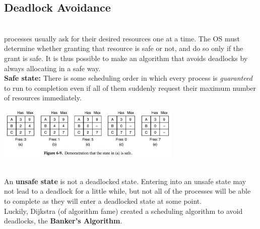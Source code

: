 \documentclass{article}
\begin{document}
\subsection*{Deadlock Avoidance}
\\processes usually ask for their desired resources one at a time. The OS must determine whether granting that resource is safe or not, and do so only if the grant is safe. It is thus possible to make an algorithm that avoids deadlocks by always allocating in a safe way.
\\\textbf{Safe state:} There is some scheduling order in which every process is \textit{guaranteed} to run to completion even if all of them suddenly request their maximum number of resources immediately.
\begin{center}
\includegraphics[width= 250pt]{tex/ch6/6-9.png}
\end{center}
\\An \textbf{unsafe state} is not a deadlocked state. Entering into an unsafe state may not lead to a deadlock for a little while, but not all of the processes will be able to complete as they will enter a deadlocked state at some point.
\\Luckily, Dijkstra (of algorithm fame) created a scheduling algorithm to avoid deadlocks, the \textbf{Banker's Algorithm}.
\end{document}
